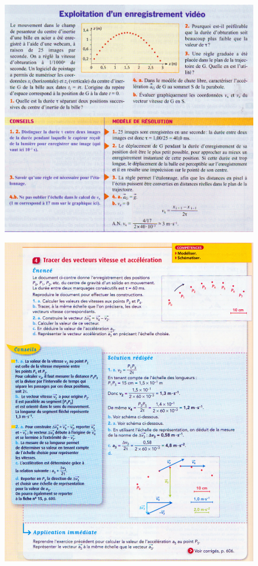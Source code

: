 \documentclass[11pt,a4paper]{article}
\begin{document}

\begin{figure}[h]
    \centering
    \includegraphics[width=\linewidth]{imgs/p1/xo1.jpg}
\end{figure}

\begin{figure}[h]
    \centering
    \includegraphics[width=\linewidth]{imgs/p1/xo2.jpg}
\end{figure}
\end{document}
